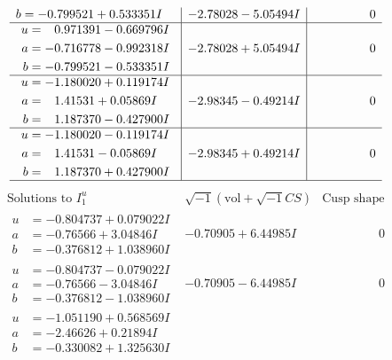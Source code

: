 \documentclass[1p]{elsarticle_modified}
\theoremstyle{definition}
\newcommand{\I}{\sqrt{-1}}
\begin{document}
$$\begin{array}{c|c|c}
\begin{aligned}
b &= -0.799521 + 0.533351 I\end{aligned}
 & -2.78028 - 5.05494 I & \phantom{-0.000000 } 0 \\ \hline\begin{aligned}
u &= \phantom{-}0.971391 - 0.669796 I \\
a &= -0.716778 - 0.992318 I \\
b &= -0.799521 - 0.533351 I\end{aligned}
 & -2.78028 + 5.05494 I & \phantom{-0.000000 } 0 \\ \hline\begin{aligned}
u &= -1.180020 + 0.119174 I \\
a &= \phantom{-}1.41531 + 0.05869 I \\
b &= \phantom{-}1.187370 - 0.427900 I\end{aligned}
 & -2.98345 - 0.49214 I & \phantom{-0.000000 } 0 \\ \hline\begin{aligned}
u &= -1.180020 - 0.119174 I \\
a &= \phantom{-}1.41531 - 0.05869 I \\
b &= \phantom{-}1.187370 + 0.427900 I\end{aligned}
 & -2.98345 + 0.49214 I & \phantom{-0.000000 } 0\\
 \hline 
 \end{array}$$\newpage$$\begin{array}{c|c|c}  
\text{Solutions to }I^u_{1}& \I (\text{vol} + \sqrt{-1}CS) & \text{Cusp shape}\\
 \hline 
\begin{aligned}
u &= -0.804737 + 0.079022 I \\
a &= -0.76566 + 3.04846 I \\
b &= -0.376812 + 1.038960 I\end{aligned}
 & -0.70905 + 6.44985 I & \phantom{-0.000000 } 0 \\ \hline\begin{aligned}
u &= -0.804737 - 0.079022 I \\
a &= -0.76566 - 3.04846 I \\
b &= -0.376812 - 1.038960 I\end{aligned}
 & -0.70905 - 6.44985 I & \phantom{-0.000000 } 0 \\ \hline\begin{aligned}
u &= -1.051190 + 0.568569 I \\
a &= -2.46626 + 0.21894 I \\
b &= -0.330082 + 1.325630 I\end{aligned}

\end{array}$$
\end{document}
